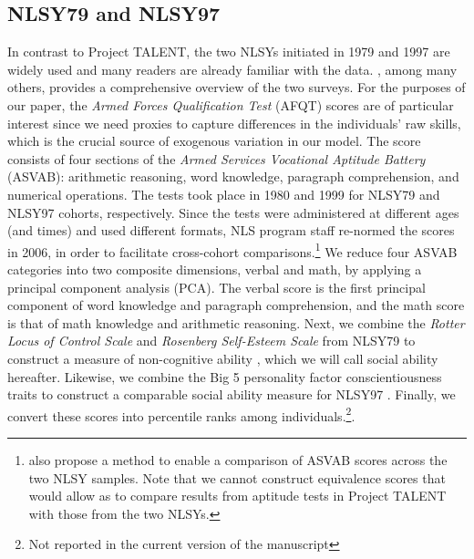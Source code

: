 \documentclass[onehalfspacing,11pt]{article}
\begin{document}
	
	\subsection{NLSY79 and NLSY97}
	In contrast to Project TALENT, the two NLSYs initiated in 1979 and 1997 are widely used and many readers are already familiar with the data. \cite{Cooksey:2018}, among many others, provides a comprehensive overview of the two surveys. For the purposes of our paper, the {\it Armed Forces Qualification Test} (AFQT) scores are of particular interest since we need proxies to capture differences in the individuals' raw skills, which is the crucial source of exogenous variation in our model. The score consists of four sections of the {\it Armed Services Vocational Aptitude Battery} (ASVAB): arithmetic reasoning, word knowledge, paragraph comprehension, and numerical operations. The tests took place in 1980 and 1999 for NLSY79 and NLSY97 cohorts, respectively. Since the tests were administered at different ages (and times) and used different formats, NLS program staff re-normed the scores in 2006, in order to facilitate cross-cohort comparisons.\footnote{\cite{Altonji:2009} also propose a method to enable a comparison of ASVAB scores across the two NLSY samples. Note that we cannot construct equivalence scores that would allow as to compare results from aptitude tests in Project TALENT with those from the two NLSYs.} We reduce four ASVAB categories into two composite dimensions, verbal and math, by applying a principal component analysis (PCA). The verbal score is the first principal component of word knowledge and paragraph comprehension, and the math score is that of math knowledge and arithmetic reasoning. 
	Next, we combine the {\it Rotter Locus of Control Scale} and {\it Rosenberg Self-Esteem Scale} from NLSY79 to construct a measure of non-cognitive ability \citep{Heckman:2006,Bowles:2001}, which we will call social ability hereafter. Likewise, we combine the Big 5 personality factor conscientiousness traits to construct a comparable social ability measure for NLSY97 \citep{Deming:2017}. Finally, we convert these scores into percentile ranks among individuals.\footnote{Not reported in the current version of the manuscript}. 
	
\end{document}
